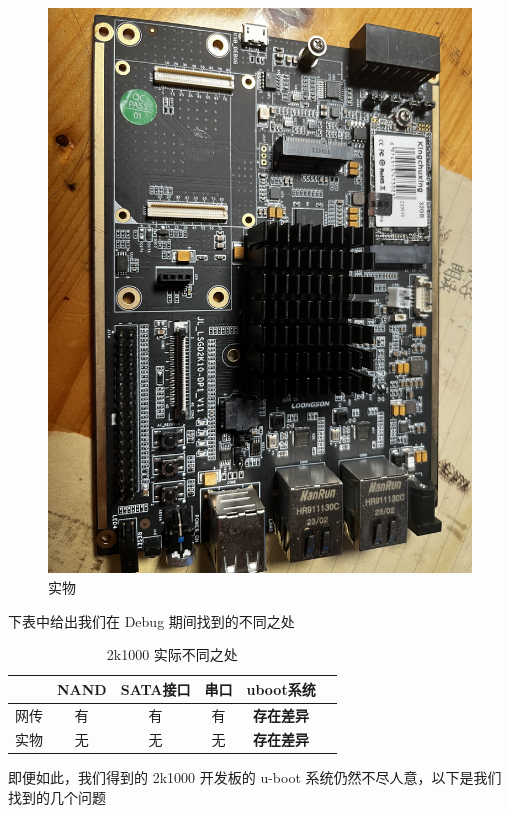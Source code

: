 \begin{figure}[htbp]
\begin{minipage}{0.49\linewidth}
		\includegraphics[width=0.9\linewidth]{figs/2k10dp1v11.jpg}
		\caption{实物}
		\label{Board-RealEstate}
	\end{minipage}
\end{figure}

下表中给出我们在 Debug 期间找到的不同之处

\begin{table}[htbp]
	\begin{center}
		\begin{tabular}{|c|c|c|c|c|c|}
			\hline
			& NAND & SATA接口 & 串口 & uboot系统\\
			\hline
			\hline
			网传 & 有 & 有 & 有 & \textbf{存在差异} \\
			\hline
			实物 & 无 & 无 & 无 & \textbf{存在差异} \\
			\hline
		\end{tabular}
		\caption{2k1000 实际不同之处}
	\end{center}
\end{table}

即便如此，我们得到的 2k1000 开发板的 u-boot 系统仍然不尽人意，以下是我们找到的几个问题

